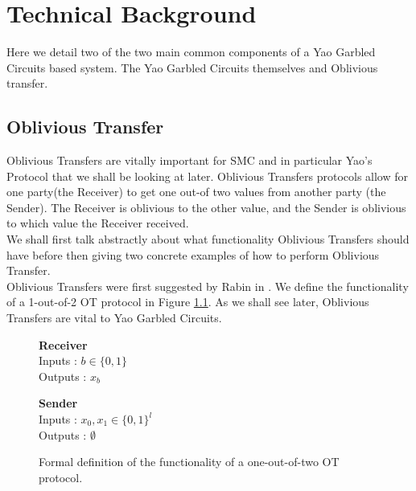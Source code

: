 \documentclass[ %
                    author={Nicholas Tutte},
                supervisor={Prof. Nigel Smart},
                    degree={MEng},
                     title={Secure Two Party Computation},
                  subtitle={A practical comparison of recent protocols},
                      type={Research - GG1K},
                      year={2015} ]{dissertation}
\begin{document}
	
	\chapter{Technical Background}
		Here we detail two of the two main common components of a Yao Garbled Circuits based system. The Yao Garbled Circuits themselves and Oblivious transfer.

		\section{Oblivious Transfer} \label{sec:OT_Intro}
			Oblivious Transfers are vitally important for SMC and in particular Yao's Protocol that we shall be looking at later. Oblivious Transfers protocols allow for one party(the Receiver) to get one out-of two values from another party (the Sender). The Receiver is oblivious to the other value, and the Sender is oblivious to which value the Receiver received.\\

			We shall first talk abstractly about what functionality Oblivious Transfers should have before then giving two concrete examples of how to perform Oblivious Transfer.\\

			Oblivious Transfers were first suggested by Rabin in \cite{Rabin81}. We define the functionality of a 1-out-of-2 OT protocol in Figure \ref{fig:OTformalDef}. As we shall see later, Oblivious Transfers are vital to Yao Garbled Circuits. 

			\begin{figure}[!htb]
				\centering
				\begin{minipage}{0.45\textwidth}
					\centering
					\textbf{Receiver}\\
					Inputs : $b \in \{0, 1\}$\\
					Outputs : $x_b$\\
				\end{minipage}
				\begin{minipage}{0.45\textwidth}
					\centering
					\textbf{Sender}\\
					Inputs : $x_0, x_1 \in \{0, 1\}^l$\\
					Outputs : $\emptyset$\\
				\end{minipage}

				\caption{ Formal definition of the functionality of a one-out-of-two OT protocol.\label{fig:OTformalDef}}
			\end{figure}
\end{document}
